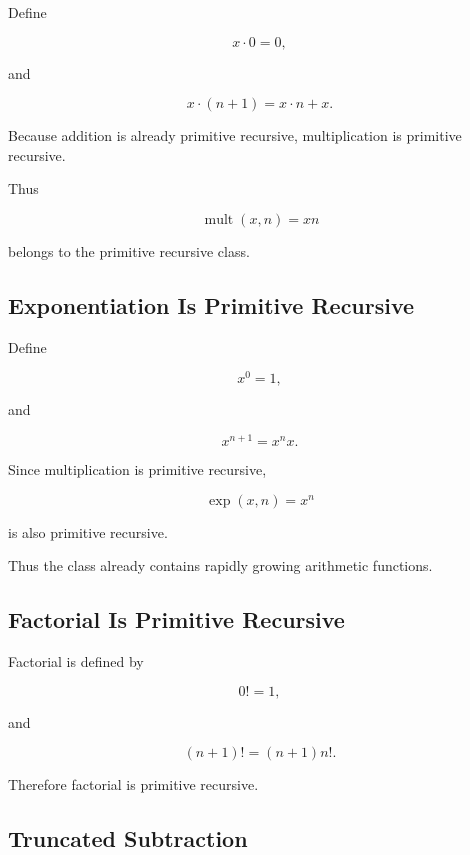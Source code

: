 Define

\[
\boxed{
x\cdot0=0,
}
\]

and

\[
\boxed{
x\cdot(n+1)
=
x\cdot n+x.
}
\]

Because addition is already primitive recursive, multiplication is primitive
recursive.

Thus

\[
\boxed{
\operatorname{mult}(x,n)=xn
}
\]

belongs to the primitive recursive class.

\subsection{Exponentiation Is Primitive Recursive}
\label{subsec:exponentiation-primitive-recursive}

Define

\[
\boxed{
x^0=1,
}
\]

and

\[
\boxed{
x^{n+1}
=
x^n x.
}
\]

Since multiplication is primitive recursive,

\[
\boxed{
\operatorname{exp}(x,n)=x^n
}
\]

is also primitive recursive.

Thus the class already contains rapidly growing arithmetic functions.

\subsection{Factorial Is Primitive Recursive}
\label{subsec:factorial-primitive-recursive}

Factorial is defined by

\[
\boxed{
0!=1,
}
\]

and

\[
\boxed{
(n+1)!
=
(n+1)n!.
}
\]

Therefore factorial is primitive recursive.

\subsection{Truncated Subtraction}
\label{subsec:truncated-subtraction}

